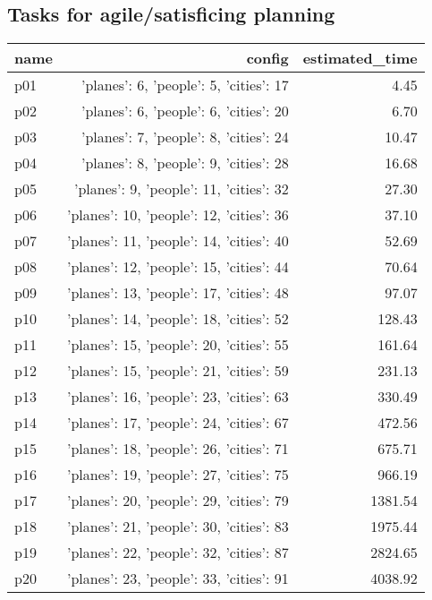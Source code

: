 \documentclass{article}
\begin{document}
                    

                                \subsection*{Tasks for agile/satisficing planning}
                                
                            \begin{center}
                            \scriptsize
                            \begin{tabular}{@{}l|r|r@{}}
                            name & config & estimated\_time\\\midrule
                              p01&{'planes': 6, 'people': 5, 'cities': 17}&4.45\\
  p02&{'planes': 6, 'people': 6, 'cities': 20}&6.70\\
  p03&{'planes': 7, 'people': 8, 'cities': 24}&10.47\\
  p04&{'planes': 8, 'people': 9, 'cities': 28}&16.68\\
  p05&{'planes': 9, 'people': 11, 'cities': 32}&27.30\\
  p06&{'planes': 10, 'people': 12, 'cities': 36}&37.10\\
  p07&{'planes': 11, 'people': 14, 'cities': 40}&52.69\\
  p08&{'planes': 12, 'people': 15, 'cities': 44}&70.64\\
  p09&{'planes': 13, 'people': 17, 'cities': 48}&97.07\\
  p10&{'planes': 14, 'people': 18, 'cities': 52}&128.43\\
  p11&{'planes': 15, 'people': 20, 'cities': 55}&161.64\\
  p12&{'planes': 15, 'people': 21, 'cities': 59}&231.13\\
  p13&{'planes': 16, 'people': 23, 'cities': 63}&330.49\\
  p14&{'planes': 17, 'people': 24, 'cities': 67}&472.56\\
  p15&{'planes': 18, 'people': 26, 'cities': 71}&675.71\\
  p16&{'planes': 19, 'people': 27, 'cities': 75}&966.19\\
  p17&{'planes': 20, 'people': 29, 'cities': 79}&1381.54\\
  p18&{'planes': 21, 'people': 30, 'cities': 83}&1975.44\\
  p19&{'planes': 22, 'people': 32, 'cities': 87}&2824.65\\
  p20&{'planes': 23, 'people': 33, 'cities': 91}&4038.92\\

\end{tabular}
\end{center}
\end{document}
